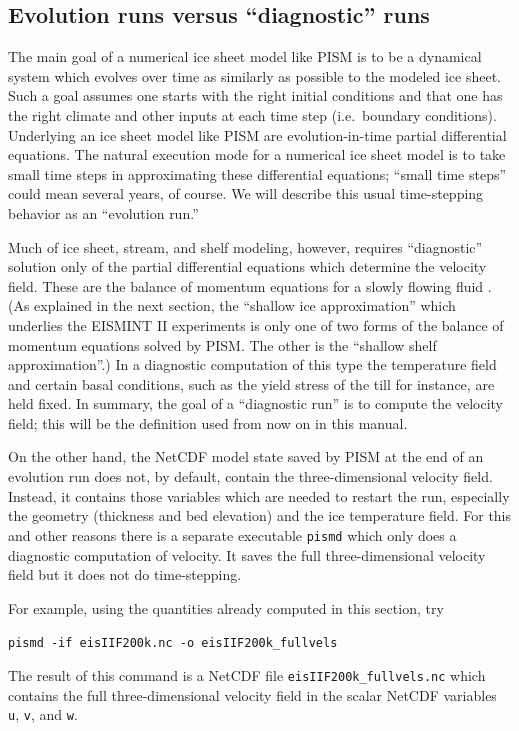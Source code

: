 \documentclass[11pt,final]{amsart}
\begin{document}
\subsection{Evolution runs versus ``diagnostic'' runs}  The main goal of a numerical ice sheet model like PISM is to be a dynamical system which evolves over time as similarly as possible to the modeled ice sheet.  Such a goal assumes one starts with the right initial conditions and that one has the right climate and other inputs at each time step (i.e.~boundary conditions).  Underlying an ice sheet model like PISM are evolution-in-time partial differential equations.  The natural execution mode for a numerical ice sheet model is to take small time steps in approximating these differential equations; ``small time steps'' could mean several years, of course.  We will describe this usual time-stepping behavior as an ``evolution run.''

Much of ice sheet, stream, and shelf modeling, however, requires ``diagnostic'' solution only of the partial differential equations which determine the velocity field.  These are the balance of momentum equations for a slowly flowing fluid \cite{Fowler}.  (As explained in the next section, the ``shallow ice approximation'' which underlies the EISMINT II experiments is only one of two forms of the balance of momentum equations solved by PISM.  The other is the ``shallow shelf approximation''.)  In a diagnostic computation of this type the temperature field and certain basal conditions, such as the yield stress of the till for instance, are held fixed.  In summary, the goal of a ``diagnostic run'' is to compute the velocity field; this will be the definition used from now on in this manual.

On the other hand, the NetCDF model state saved by PISM at the end of an evolution run does not, by default, contain the three-dimensional velocity field.  Instead, it contains those variables which are needed to restart the run, especially the geometry (thickness and bed elevation) and the ice temperature field.  For this and other reasons there is a separate executable \verb|pismd| which only does a diagnostic computation of velocity.  It saves the full three-dimensional velocity field but it does not do time-stepping.

For example, using the quantities already computed in this section, try

\verb|pismd -if eisIIF200k.nc -o eisIIF200k_fullvels|

\noindent The result of this command is a NetCDF file \verb|eisIIF200k_fullvels.nc| which contains the full three-dimensional velocity field in the scalar NetCDF variables \verb|u|, \verb|v|, and \verb|w|.
\end{document}
